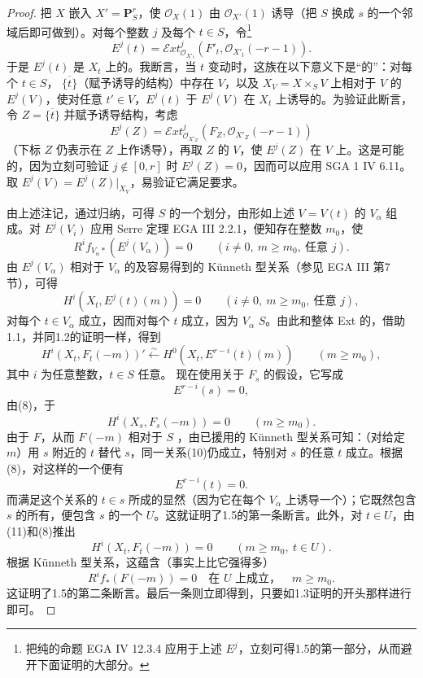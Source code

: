 \begin{proof}
把 $X$ 嵌入 $X'=\mathbf P_S^r$，使 $\mathcal O_X(1)$ 由 $\mathcal O_{X'}(1)$ 诱导（把 $S$ 换成 $s$ 的一个邻域后即可做到）。对每个整数 $j$ 及每个 $t\in S$，令\footnote{把纯的命题 EGA IV 12.3.4 应用于上述 $E^j$，立刻可得1.5的第一部分，从而避开下面证明的大部分。}
\[
 E^j(t)=\mathcal Ext^j_{\mathcal O_{X'_t}}(F'_t,\mathcal O_{X'_t}(-r-1)).\tag{7}
\]
于是 $E^j(t)$ 是 $X_t$ 上的。我断言，当 $t$ 变动时，这族在以下意义下是“的”：对每个 $t\in S$， $\overline{\{t\}}$（赋予诱导的结构）中存在 $V$，以及 $X_V=X\times_SV$ 上相对于 $V$ 的 $E^j(V)$，使对任意 $t'\in V$，$E^j(t)$ 于 $E^j(V)$ 在 $X_t$ 上诱导的。为验证此断言，令 $Z=\overline{\{t\}}$ 并赋予诱导结构，考虑
\[
 E^j(Z)=\mathcal Ext^j_{\mathcal O_{X'_Z}}(F_Z,\mathcal O_{X'_Z}(-r-1))
\]
（下标 $Z$ 仍表示在 $Z$ 上作诱导），再取 $Z$ 的 $V$，使 $E^j(Z)$ 在 $V$ 上。这是可能的，因为立刻可验证 $j\notin[0,r]$ 时 $E^j(Z)=0$，因而可以应用 SGA 1 IV 6.11。取 $E^j(V)=E^j(Z)|_{X_V}$，易验证它满足要求。

由上述注记，通过归纳，可得 $S$ 的一个划分，由形如上述 $V=V(t)$ 的 $V_\alpha$ 组成。对 $E^j(V_i)$ 应用 Serre 定理 EGA III 2.2.1，便知存在整数 $m_0$，使
\[
 R^if_{V_\alpha*}(E^j(V_\alpha))=0\qquad(i\neq0,\ m\geq m_0,\ \text{任意 }j).
\]
由 $E^j(V_\alpha)$ 相对于 $V_\alpha$ 的及容易得到的 Künneth 型关系（参见 EGA III 第7节），可得
\[
 H^i(X_t,E^j(t)(m))=0\qquad(i\neq0,\ m\geq m_0,\ \text{任意 }j),
\]
对每个 $t\in V_\alpha$ 成立，因而对每个 $t$ 成立，因为 $V_\alpha$  $S$。由此和整体 Ext 的，借助1.1，并同1.2的证明一样，得到
\[
 H^i(X_t,F_t(-m))'\xleftarrow{\sim}H^0(X_t,E^{r-i}(t)(m))\qquad(m\geq m_0),\tag{8}
\]
其中 $i$ 为任意整数，$t\in S$ 任意。
现在使用关于 $F_s$ 的假设，它写成
\[
 E^{r-i}(s)=0,\tag{9}
\]
由(8)，于
\[
 H^i(X_s,F_s(-m))=0\qquad(m\geq m_0).\tag{10}
\]
由于 $F$，从而 $F(-m)$ 相对于 $S$ ，由已援用的 Künneth 型关系可知：（对给定 $m$）用 $s$ 附近的 $t$ 替代 $s$，同一关系(10)仍成立，特别对 $s$ 的任意 $t$ 成立。根据(8)，对这样的一个便有
\[
 E^{r-i}(t)=0.\tag{11}
\]
而满足这个关系的 $t\in s$ 所成的显然（因为它在每个 $V_\alpha$ 上诱导一个）；它既然包含 $s$ 的所有，便包含 $s$ 的一个 $U$。这就证明了1.5的第一条断言。此外，对 $t\in U$，由(11)和(8)推出
\[
 H^i(X_t,F_t(-m))=0\qquad(m\geq m_0,\ t\in U).\tag{12}
\]
根据 Künneth 型关系，这蕴含（事实上比它强得多）
\[
 R^if_*(F(-m))=0\quad\text{在 }U\text{ 上成立，}\quad m\geq m_0.\tag{13}
\]
这证明了1.5的第二条断言。最后一条则立即得到，只要如1.3证明的开头那样进行即可。
\end{proof}
